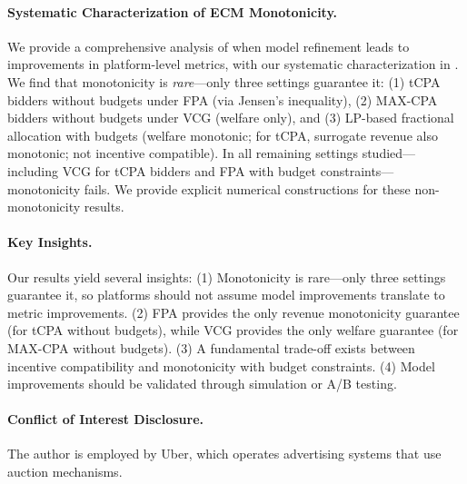 \paragraph{Systematic Characterization of ECM Monotonicity.} We provide a comprehensive analysis of when model refinement leads to improvements in platform-level metrics, with our systematic characterization in . We find that monotonicity is \emph{rare}---only three settings guarantee it: (1) tCPA bidders without budgets under FPA (via Jensen's inequality), (2) MAX-CPA bidders without budgets under VCG (welfare only), and (3) LP-based fractional allocation with budgets (welfare monotonic; for tCPA, surrogate revenue also monotonic; not incentive compatible). In all remaining settings studied---including VCG for tCPA bidders and FPA with budget constraints---monotonicity fails. We provide explicit numerical constructions for these non-monotonicity results.


\paragraph{Key Insights.} Our results yield several insights: (1) Monotonicity is rare---only three settings guarantee it, so platforms should not assume model improvements translate to metric improvements. (2) FPA provides the only revenue monotonicity guarantee (for tCPA without budgets), while VCG provides the only welfare guarantee (for MAX-CPA without budgets). (3) A fundamental trade-off exists between incentive compatibility and monotonicity with budget constraints. (4) Model improvements should be validated through simulation or A/B testing.

\paragraph{Conflict of Interest Disclosure.} The author is employed by Uber, which operates advertising systems that use auction mechanisms.
